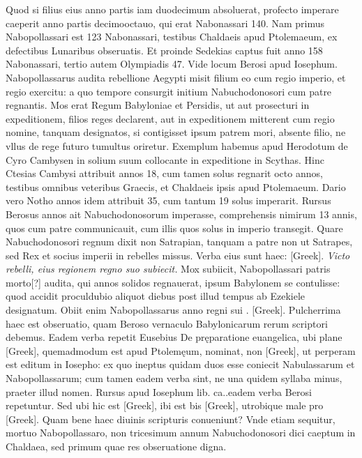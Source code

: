 Quod si filius eius anno  partis iam duodecimum
absoluerat, profecto imperare caeperit anno partis decimooctauo,
qui erat Nabonassari 140.
Nam primus Nabopollassari est 123 Nabonassari,
testibus Chaldaeis apud Ptolemaeum, ex defectibus Lunaribus
obseruatis.
Et proinde Sedekias captus fuit anno 158 Nabonassari,
tertio autem Olympiadis 47.
Vide locum Berosi apud Iosephum.
Nabopollassarus audita rebellione Aegypti misit filium eo
cum regio imperio, et regio exercitu: a quo tempore consurgit initium
Nabuchodonosori cum patre regnantis.
Mos erat Regum Babyloniae
et Persidis, ut aut prosecturi in expeditionem, filios reges declarent,
aut in expeditionem mitterent cum regio nomine, tanquam
designatos, si contigisset ipsum patrem mori, absente filio, ne
vllus de rege futuro tumultus oriretur.
Exemplum habemus apud
Herodotum de Cyro Cambysen in solium suum collocante in expeditione
in Scythas.
Hinc Ctesias Cambysi attribuit annos 18,
cum tamen solus regnarit octo annos, testibus omnibus veteribus
Graecis, et Chaldaeis ipsis apud Ptolemaeum.
Dario vero Notho annos
idem attribuit 35, cum tantum 19 solus imperarit.
Rursus Berosus
 annos ait Nabuchodonosorum imperasse, comprehensis
nimirum 13 annis, quos cum patre communicauit, cum
illis quos solus in imperio transegit.
Quare Nabuchodonosori regnum
dixit non Satrapian, tanquam a patre non ut Satrapes, sed Rex
et socius imperii in rebelles missus.
Verba eius sunt haec: \textgreek{[Greek]}.
\textit{Victo rebelli, eius regionem regno suo subiecit.}
Mox subiicit, Nabopollassari patris morto[?]
audita, qui  annos solidos regnauerat, ipsum Babylonem se
contulisse: quod accidit proculdubio aliquot diebus post illud tempus
ab Ezekiele designatum.
Obiit enim Nabopollassarus anno regni
sui .
\textgreek{[Greek]}.
Pulcherrima haec est obseruatio, quam Beroso vernaculo
Babylonicarum rerum scriptori debemus.
Eadem verba repetit Eusebius
De pręparatione euangelica, ubi plane \textgreek{[Greek]}, quemadmodum
est apud Ptolemęum, nominat, non \textgreek{[Greek]}, ut perperam
est editum in Iosepho: ex quo ineptus quidam duos esse coniecit
Nabulassarum et Nabopollassarum; cum tamen eadem verba sint, ne
una quidem syllaba minus, praeter illud nomen.
Rursus apud Iosephum
lib. ca..eadem verba Berosi repetuntur.
Sed ubi hic est \textgreek{[Greek]},
ibi est bis \textgreek{[Greek]}, utrobique male pro \textgreek{[Greek]}.
Quam bene haec diuinis scripturis conueniunt?
Vnde etiam sequitur, mortuo Nabopollassaro, non tricesimum
 annum Nabuchodonosori
dici caeptum in Chaldaea, sed primum quae res obseruatione
digna.

